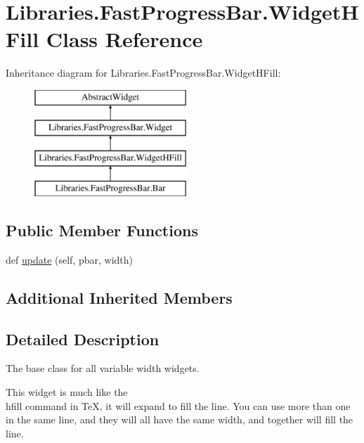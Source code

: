 \hypertarget{class_libraries_1_1_fast_progress_bar_1_1_widget_h_fill}{}\section{Libraries.\+Fast\+Progress\+Bar.\+Widget\+H\+Fill Class Reference}
\label{class_libraries_1_1_fast_progress_bar_1_1_widget_h_fill}
Inheritance diagram for Libraries.\+Fast\+Progress\+Bar.\+Widget\+H\+Fill\+:\begin{figure}[H]
\begin{center}
\leavevmode
\includegraphics[height=4.000000cm]{class_libraries_1_1_fast_progress_bar_1_1_widget_h_fill}
\end{center}
\end{figure}
\subsection*{Public Member Functions}
\begin{DoxyCompactItemize}
\item 
def \hyperlink{class_libraries_1_1_fast_progress_bar_1_1_widget_h_fill_a77466f3e623a9f5ba65bb4e0ad1d3b4c}{update} (self, pbar, width)
\end{DoxyCompactItemize}
\subsection*{Additional Inherited Members}


\subsection{Detailed Description}
\begin{DoxyVerb}The base class for all variable width widgets.

This widget is much like the \\hfill command in TeX, it will expand to
fill the line. You can use more than one in the same line, and they will
all have the same width, and together will fill the line.
\end{DoxyVerb}
 

